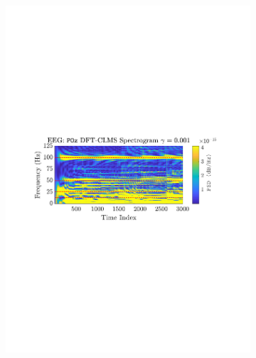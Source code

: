 \documentclass[12pt]{article}
\numberwithin{equation}{section}
\begin{document}
\begin{figure}[H]
\begin{subfigure}{0.49\textwidth}
					\includegraphics[trim={2.2cm 11.2cm 2.90cm  11.2cm}, clip, width=\textwidth]{../MATLAB/figures/q3_3d_fig02.pdf} 
					\captionsetup{justification=centering}
				\end{subfigure}
				

\end{figure}
\end{document}

